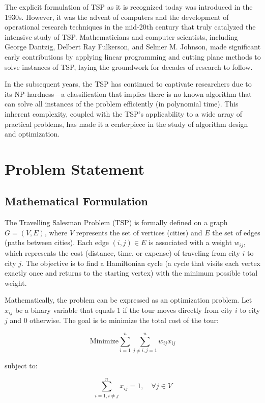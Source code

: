 The explicit formulation of TSP as it is recognized today was introduced in the 1930s. However, it was the advent of computers and the development of operational research techniques in the mid-20th century that truly catalyzed the intensive study of TSP. Mathematicians and computer scientists, including George Dantzig, Delbert Ray Fulkerson, and Selmer M. Johnson, made significant early contributions by applying linear programming and cutting plane methods to solve instances of TSP, laying the groundwork for decades of research to follow.

In the subsequent years, the TSP has continued to captivate researchers due to its NP-hardness—a classification that implies there is no known algorithm that can solve all instances of the problem efficiently (in polynomial time). This inherent complexity, coupled with the TSP's applicability to a wide array of practical problems, has made it a centerpiece in the study of algorithm design and optimization.


\section{Problem Statement}

\subsection{Mathematical Formulation}


The Travelling Salesman Problem (TSP) is formally defined on a graph \(G = (V, E)\), where \(V\) represents the set of vertices (cities) and \(E\) the set of edges (paths between cities). Each edge \((i, j) \in E\) is associated with a weight \(w_{ij}\), which represents the cost (distance, time, or expense) of traveling from city \(i\) to city \(j\). The objective is to find a Hamiltonian cycle (a cycle that visits each vertex exactly once and returns to the starting vertex) with the minimum possible total weight.

Mathematically, the problem can be expressed as an optimization problem. Let \(x_{ij}\) be a binary variable that equals 1 if the tour moves directly from city \(i\) to city \(j\) and 0 otherwise. The goal is to minimize the total cost of the tour:

\[
    \text{Minimize} \sum_{i=1}^{n} \sum_{j \ne i, j=1}^{n} w_{ij} x_{ij}
\]

subject to:

\[
    \sum_{i=1, i \ne j}^{n} x_{ij} = 1, \quad \forall j \in V
\]

